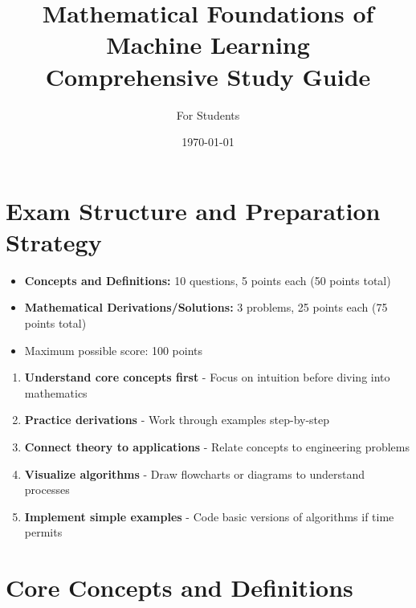 \documentclass[12pt]{article}
\begin{document}
\title{Mathematical Foundations of Machine Learning\\Comprehensive Study Guide}
\author{For Students}
\date{\today}
\maketitle

\tableofcontents
\newpage

\section{Exam Structure and Preparation Strategy}

\begin{tcolorbox}[title=Exam Format, colback=yellow!5, colframe=yellow!50!black]
\begin{itemize}
    \item \textbf{Concepts and Definitions:} 10 questions, 5 points each (50 points total)
    \item \textbf{Mathematical Derivations/Solutions:} 3 problems, 25 points each (75 points total)
    \item Maximum possible score: 100 points
\end{itemize}
\end{tcolorbox}

\begin{tcolorbox}[title=Study Strategy, colback=yellow!5, colframe=yellow!50!black]
\begin{enumerate}
    \item \textbf{Understand core concepts first} - Focus on intuition before diving into mathematics
    \item \textbf{Practice derivations} - Work through examples step-by-step
    \item \textbf{Connect theory to applications} - Relate concepts to engineering problems
    \item \textbf{Visualize algorithms} - Draw flowcharts or diagrams to understand processes
    \item \textbf{Implement simple examples} - Code basic versions of algorithms if time permits
\end{enumerate}
\end{tcolorbox}

\section{Core Concepts and Definitions}
\end{document}
